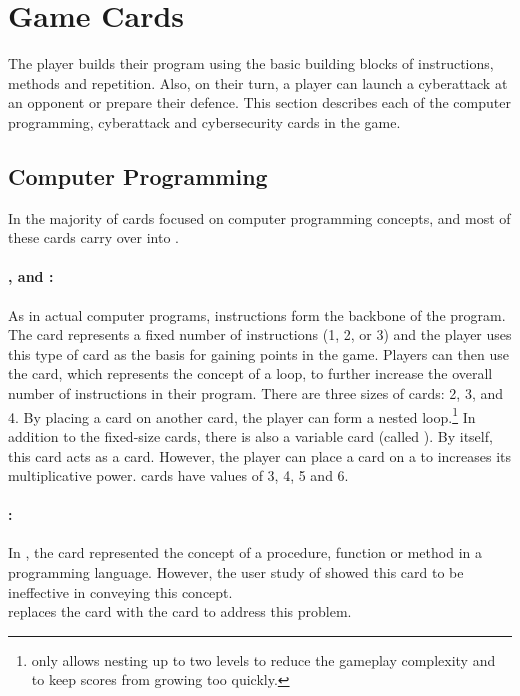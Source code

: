 \section{Game Cards}
The player builds their program using the basic building blocks of instructions, methods and repetition. Also, on their turn, a player can launch a cyberattack at an opponent or prepare their defence. This section describes each of the computer programming, cyberattack and cybersecurity cards in the game.

\subsection{Computer Programming}
In \pwOne the majority of cards focused on computer programming concepts, and most of these cards carry over into \pwThree. 

\paragraph{\Ins, \R and \Vns:}As in actual computer programs, instructions form the backbone of the program. The \I card represents a fixed number of instructions (1, 2, or 3) and the player uses this type of card as the basis for gaining points in the game. Players can then use the \R card, which represents the concept of a loop, to further increase the overall number of instructions in their program. There are three sizes of \R cards: 2, 3, and 4. By placing a \R card on another \R card, the player can form a nested loop.\footnote{\gameName only allows nesting up to two levels to reduce the gameplay complexity and to keep scores from growing too quickly.} In addition to the fixed-size \R cards, there is also a variable \R card (called \Rxns). By itself, this card acts as a  card. However, the player can place a \V card on a \Rx to increases its multiplicative power. \V cards have values of 3, 4, 5 and 6. 


\paragraph{\Mns:}
In \pwOneNS, the \Gr card represented the concept of a procedure, function or method in a programming language. However, the user study of \pwOne showed this card to be ineffective in conveying this concept. \pwThree\\ replaces the \Gr card with the \M card to address this problem.

